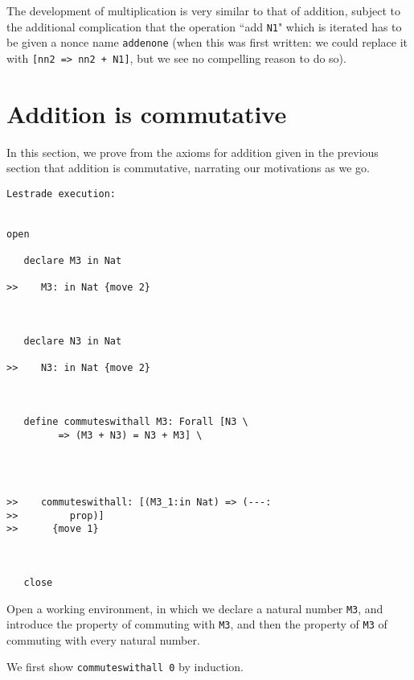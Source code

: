 \documentclass[12pt]{article}
\begin{document}
The development of multiplication is very similar to that of addition, subject to the additional complication that the operation ``add {\tt N1}" which is iterated has to be given
a nonce name {\tt addenone} (when this was first written:  we could replace it with {\tt [nn2 => nn2 + N1]}, but we see no compelling reason to do so).

\section{Addition is commutative}

In this section, we prove from the axioms for addition given in the previous section that addition is commutative, narrating our motivations
as we go.



\begin{verbatim}Lestrade execution:


open

   declare M3 in Nat

>>    M3: in Nat {move 2}



   declare N3 in Nat

>>    N3: in Nat {move 2}



   define commuteswithall M3: Forall [N3 \
         => (M3 + N3) = N3 + M3] \
      



>>    commuteswithall: [(M3_1:in Nat) => (---:
>>         prop)]
>>      {move 1}



   close
\end{verbatim}

Open a working environment, in which we declare a natural number {\tt M3}, and introduce the property of commuting with {\tt M3}, and then the property of {\tt M3} of commuting with every natural number.

We first show {\tt commuteswithall 0} by induction.
\end{document}

